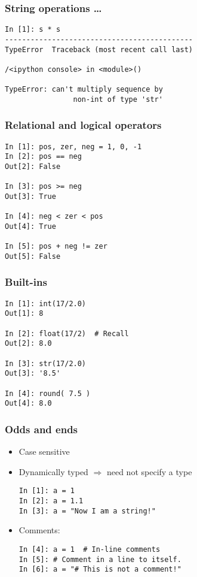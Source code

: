 \documentclass[14pt,compress]{beamer}
\newcounter{time}
\newcommand{\inctime}[1]{\addtocounter{time}{#1}{\tiny \thetime\ m}}
\begin{document}
\begin{frame}[fragile]
  \frametitle{String operations \ldots}
  \begin{lstlisting}
In [1]: s * s
--------------------------------------------
TypeError  Traceback (most recent call last)

/<ipython console> in <module>()

TypeError: can't multiply sequence by
                non-int of type 'str'
  \end{lstlisting}
\end{frame}

\begin{frame}[fragile]
  \frametitle{Relational and logical operators}
  \begin{lstlisting}
In [1]: pos, zer, neg = 1, 0, -1
In [2]: pos == neg
Out[2]: False

In [3]: pos >= neg
Out[3]: True

In [4]: neg < zer < pos
Out[4]: True

In [5]: pos + neg != zer
Out[5]: False
  \end{lstlisting}
\end{frame}

\begin{frame}[fragile]
  \frametitle{Built-ins}
  \begin{lstlisting}
In [1]: int(17/2.0)
Out[1]: 8

In [2]: float(17/2)  # Recall
Out[2]: 8.0

In [3]: str(17/2.0)
Out[3]: '8.5'

In [4]: round( 7.5 )
Out[4]: 8.0
  \end{lstlisting}
\end{frame}

\begin{frame}[fragile]
  \frametitle{Odds and ends}
  \begin{itemize}
    \item Case sensitive
    \item Dynamically typed $\Rightarrow$ need not specify a type
      \begin{lstlisting}
In [1]: a = 1
In [2]: a = 1.1
In [3]: a = "Now I am a string!"
      \end{lstlisting}
    \item Comments:
      \begin{lstlisting}
In [4]: a = 1  # In-line comments
In [5]: # Comment in a line to itself.
In [6]: a = "# This is not a comment!"
      \end{lstlisting}
  \end{itemize}
  \inctime{15}
\end{frame}
\end{document}
